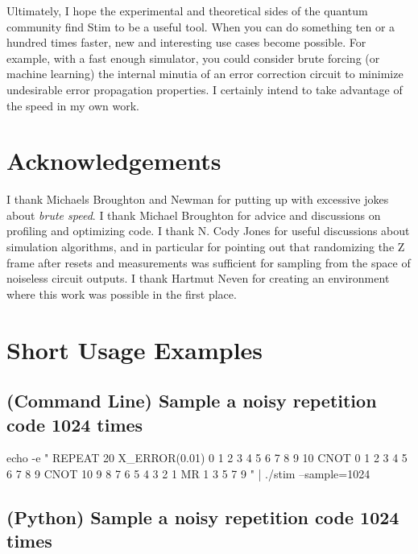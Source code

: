 \documentclass[onecolumn,unpublished]{quantumarticle}
\theoremstyle{definition}
\theoremstyle{definition}
\theoremstyle{definition}
\begin{document}
Ultimately, I hope the experimental and theoretical sides of the quantum community find Stim to be a useful tool.
When you can do something ten or a hundred times faster, new and interesting use cases become possible.
For example, with a fast enough simulator, you could consider brute forcing (or machine learning) the internal minutia of an error correction circuit to minimize undesirable error propagation properties.
I certainly intend to take advantage of the speed in my own work.


\section{Acknowledgements}

I thank Michaels Broughton and Newman for putting up with excessive jokes about {\em brute speed}.
I thank Michael Broughton for advice and discussions on profiling and optimizing code.
I thank N. Cody Jones for useful discussions about simulation algorithms, and in particular for pointing out that randomizing the Z frame after resets and measurements was sufficient for sampling from the space of noiseless circuit outputs.
I thank Hartmut Neven for creating an environment where this work was possible in the first place.





\appendix

\section{Short Usage Examples}
\label{sec:example}

\subsection{(Command Line) Sample a noisy repetition code 1024 times}

\begin{python}
    echo -e "
        REPEAT 20 {\n
            X_ERROR(0.01) 0 1 2 3 4 5 6 7 8 9 10\n
            CNOT 0 1 2 3 4 5 6 7 8 9\n
            CNOT 10 9 8 7 6 5 4 3 2 1\n
            MR 1 3 5 7 9\n
        }
    " | ./stim --sample=1024
\end{python}

\subsection{(Python) Sample a noisy repetition code 1024 times}
\end{document}
